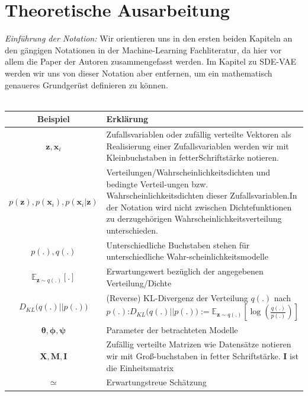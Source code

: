 \documentclass[12pt]{article}
\newcommand{\E}{\mathbb{E}}
\newcommand{\z}{\mathbf{z}}
\newcommand{\x}{\mathbf{x}_i}
\begin{document}
	\section[Theoretische Ausarbeitung]{Theoretische Ausarbeitung}
	\emph{Einführung der Notation:} Wir orientieren uns in den ersten beiden Kapiteln an den gängigen Notationen in der Machine-Learning Fachliteratur, da hier vor allem die Paper der Autoren zusammengefasst werden. Im Kapitel zu SDE-VAE werden wir uns von dieser Notation aber entfernen, um ein mathematisch genaueres Grundgerüst definieren zu können.\\ \ 
	\\
	\begin{tabular}{|c|p{11.9cm}|}
			\hline
			\textbf{Beispiel} & \textbf{Erklärung}  \\
			\hline
			$\z, \x$ &  Zufallsvariablen oder zufällig verteilte Vektoren als Realisierung \newline einer Zufallsvariablen werden wir mit Kleinbuchstaben in fetter\newline Schriftstärke notieren.  \\
			\hline
			$p(\z), p(\x), p(\x|\z)$ & Verteilungen/Wahrscheinlichkeitsdichten und bedingte Verteil-\newline ungen bzw. Wahrscheinlichkeitsdichten dieser Zufallsvariablen.\newline In der Notation wird nicht zwischen Dichtefunktionen zu der\newline zugehörigen Wahrscheinlichkeitsverteilung unterschieden.\\
			\hline
			$p(.), q(.)$ & Unterschiedliche Buchstaben stehen für unterschiedliche Wahr-\newline scheinlichkeitsmodelle\\
			\hline
			$\E_{\z\sim q(.)}[.]$ & Erwartungswert bezüglich der angegebenen Verteilung/Dichte\\
			\hline
			$D_{KL}\big(q(.)||p(.)\big)$ & (Reverse) KL-Divergenz der Verteilung $q(.)$ nach $p(.)$:\newline $D_{KL}\big(q(.)||p(.)\big):= \E_{\z\sim q(.)}\left[\log\left(\tfrac{q(.)}{p(.)}\right)\right]$ \\
			\hline
			$\boldsymbol\theta, \boldsymbol\phi, \boldsymbol\psi $ & Parameter der betrachteten Modelle \\
			\hline
			$\mathbf{X}, \mathbf{M}, \mathbf{I} $ & Zufällig verteilte Matrizen wie Datensätze notieren wir mit Groß-\newline buchstaben in fetter Schriftstärke. $\mathbf{I}$ ist die Einheitsmatrix \\
			\hline
			$\simeq $ & Erwartungstreue Schätzung \\
			\hline
		\end{tabular}
	\vspace{1cm}
\end{document}
